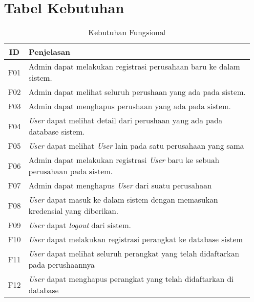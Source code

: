 \chapter{Tabel Kebutuhan}

\bgroup
\begin{table}[ht]
  \def\arraystretch{1.5}
  \caption{Kebutuhan Fungsional}
  \label{tab:kebutuhan-fungsional}
  \centering
  \begin{tabular}{|c|p{12cm}|}
    \hline
    ID  & Penjelasan                                                                                                      \\
    \hline
    F01 & Admin dapat melakukan registrasi perusahaan baru ke dalam sistem.                                               \\
    \hline
    F02 & Admin dapat melihat seluruh perushaan yang ada pada sistem.                                                     \\
    \hline
    F03 & Admin dapat menghapus perushaan yang ada pada sistem.                                                           \\
    \hline
    F04 & \textit{User} dapat melihat detail dari perushaan yang ada pada database sistem.                                \\
    \hline
    F05 & \textit{User} dapat melihat \textit{User} lain pada satu perusahaan yang sama                                   \\
    \hline
    F06 & Admin dapat melakukan registrasi \textit{User} baru ke sebuah perusahaan pada sistem.                           \\
    \hline
    F07 & Admin dapat menghapus \textit{User} dari suatu perusahaan                                                       \\
    \hline
    F08 & \textit{User} dapat masuk ke dalam sistem dengan memasukan kredensial yang diberikan.                           \\
    \hline
    F09 & \textit{User} dapat \textit{logout} dari sistem.                                                                \\
    \hline
    F10 & \textit{User} dapat melakukan registrasi perangkat ke database sistem                                           \\
    \hline
    F11 & \textit{User} dapat melihat seluruh perangkat yang telah didaftarkan pada perushaannya                          \\
    \hline
    F12 & \textit{User} dapat menghapus perangkat yang telah didaftarkan di database                                      \\

\end{tabular}
\end{table}
